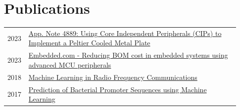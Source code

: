 \documentclass[
	10pt, %
]{FreemanCV}
\begin{document}

\section{Publications}


\begin{supertabular}{p{0.05\linewidth} p{0.88\linewidth}} %
	
	2023 & \href{
	https://ww1.microchip.com/downloads/aemDocuments/documents/MCU08/ApplicationNotes/ApplicationNotes/AN4889-Using-CIPs-To-Implement-Peltier-Plate-DS00004889.pdf
	}{
	App. Note 4889: Using Core Independent Peripherals (CIPs) to Implement a Peltier Cooled Metal Plate
	\linkcolor\scriptsize\faLink} \\
	2023 & \href{
	https://www.embedded.com/reducing-bom-cost-in-embedded-systems-using-advanced-mcu-peripherals/
	}{
	Embedded.com - Reducing BOM cost in embedded systems using advanced MCU peripherals
	\linkcolor\scriptsize\faLink} \\
	2018 & \href{
	http://joshbooth.us/wp-content/uploads/2023/08/Machine-Learning-in-Radio-Frequency-Communications.pdf
	}{
	Machine Learning in Radio Frequency Communications
	\linkcolor\scriptsize\faLink} \\
	2017 & \href{
	http://joshbooth.us/wp-content/uploads/2023/08/poster_SBME_promoter_predictions.pdf
	}{
	Prediction of Bacterial Promoter Sequences using Machine Learning
	\linkcolor\scriptsize\faLink} \\
	
\end{supertabular}
\end{document}
